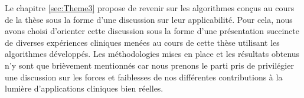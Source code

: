 Le chapitre \ref{sec:Theme3} propose de revenir sur les algorithmes conçus au cours de la thèse sous la forme d'une discussion sur leur applicabilité. Pour cela, nous avons choisi d'orienter cette discussion sous la forme d'une présentation succincte de diverses expériences cliniques menées au cours de cette thèse utilisant les algorithmes développés. Les méthodologies mises en place et les résultats obtenus n'y sont que brièvement mentionnés car nous prenons le parti pris de privilégier une discussion sur les forces et faiblesses de nos différentes contributions à la lumière d'applications cliniques bien réelles.



